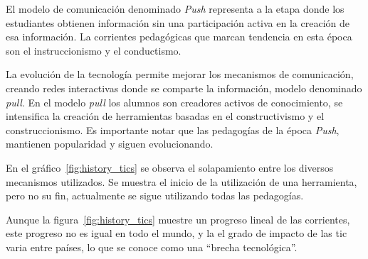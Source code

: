 El modelo de comunicación denominado \emph{Push} representa a la etapa donde los
estudiantes obtienen información sin una participación activa en la creación de
esa información\cite{white:ict}. La corrientes pedagógicas que marcan tendencia
en esta época son el instruccionismo y el
conductismo\cite{white:ict,leinonen:ict}.

La evolución de la tecnología permite mejorar los mecanismos de comunicación,
creando redes interactivas donde se comparte la información, modelo denominado
\emph{pull}. En el modelo \emph{pull} los alumnos son creadores activos de
conocimiento\cite{white:ict,leinonen:ict}, se intensifica la creación de
herramientas basadas en el constructivismo y el construccionismo. Es importante
notar que las pedagogías de la época \textit{Push}, mantienen popularidad y
siguen evolucionando\cite{white:ict}.

En el gráfico~\ref{fig:history_tics} se observa el solapamiento entre los
diversos mecanismos utilizados. Se muestra el inicio de la utilización de una
herramienta, pero no su fin, actualmente se sigue utilizando todas las
pedagogías\cite{leinonen:ict}.

Aunque la figura~\ref{fig:history_tics} muestre un progreso lineal de las
corrientes, este progreso no es igual en todo el mundo, y la el grado de impacto
de las \Gls{tic} varia entre países, lo que se conoce como una \enquote{brecha
    tecnológica}.


